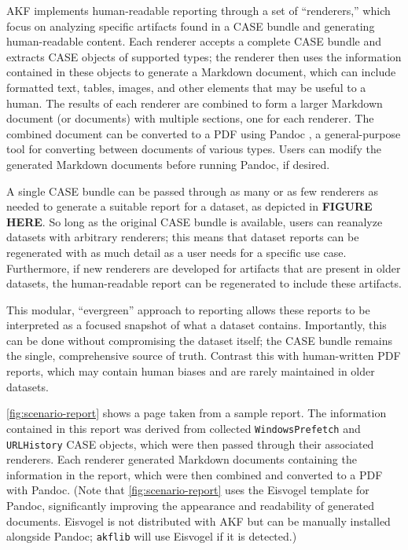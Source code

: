 AKF implements human-readable reporting through a set of ``renderers,''
which focus on analyzing specific artifacts found in a CASE bundle and
generating human-readable content. Each renderer accepts a complete CASE
bundle and extracts CASE objects of supported types; the renderer then
uses the information contained in these objects to generate a Markdown
document, which can include formatted text, tables, images, and other
elements that may be useful to a human. The results of each renderer are
combined to form a larger Markdown document (or documents) with multiple
sections, one for each renderer. The combined document can be converted
to a PDF using Pandoc \cite{macfarlanePandoc2025}, a general-purpose
tool for converting between documents of various types. Users can modify
the generated Markdown documents before running Pandoc, if desired.

A single CASE bundle can be passed through as many or as few renderers
as needed to generate a suitable report for a dataset, as depicted in
\textbf{FIGURE HERE}. So long as the original CASE bundle is available,
users can reanalyze datasets with arbitrary renderers; this means that
dataset reports can be regenerated with as much detail as a user needs
for a specific use case. Furthermore, if new renderers are developed for
artifacts that are present in older datasets, the human-readable report
can be regenerated to include these artifacts.

This modular, ``evergreen'' approach to reporting allows these reports
to be interpreted as a focused snapshot of what a dataset contains.
Importantly, this can be done without compromising the dataset itself;
the CASE bundle remains the single, comprehensive source of truth.
Contrast this with human-written PDF reports, which may contain human
biases and are rarely maintained in older datasets.

\autoref{fig:scenario-report} shows a page taken from a sample report.
The information contained in this report was derived from collected
\passthrough{\lstinline!WindowsPrefetch!} and
\passthrough{\lstinline!URLHistory!} CASE objects, which were then
passed through their associated renderers. Each renderer generated
Markdown documents containing the information in the report, which were
then combined and converted to a PDF with Pandoc. (Note that
\autoref{fig:scenario-report} uses the Eisvogel template
\cite{waglerWandmalfarbePandoclatextemplate2025} for Pandoc,
significantly improving the appearance and readability of generated
documents. Eisvogel is not distributed with AKF but can be manually
installed alongside Pandoc; \passthrough{\lstinline!akflib!} will use
Eisvogel if it is detected.)


